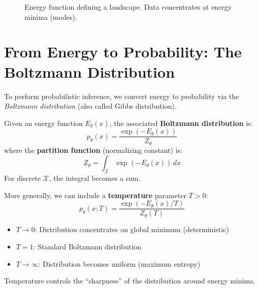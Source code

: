 \begin{figure}[h]
\centering
\caption{Energy function defining a landscape. Data concentrates at energy minima (modes).}
\end{figure}

\section{From Energy to Probability: The Boltzmann Distribution}

To perform probabilistic inference, we convert energy to probability via the \emph{Boltzmann distribution} (also called Gibbs distribution).

\begin{definition}
    Given an energy function $E_\theta(x)$, the associated \textbf{Boltzmann distribution} is:
    \[
        p_\theta(x) = \frac{\exp(-E_\theta(x))}{Z_\theta}
    \]
    where the \textbf{partition function} (normalizing constant) is:
    \[
        Z_\theta = \int_{\mathcal{X}} \exp(-E_\theta(x)) \, dx
    \]
    For discrete $\mathcal{X}$, the integral becomes a sum.
\end{definition}

\begin{remark}
    More generally, we can include a \textbf{temperature} parameter $T > 0$:
    \[
        p_\theta(x; T) = \frac{\exp(-E_\theta(x)/T)}{Z_\theta(T)}
    \]
    \begin{itemize}
        \item $T \to 0$: Distribution concentrates on global minimum (deterministic)
        \item $T = 1$: Standard Boltzmann distribution
        \item $T \to \infty$: Distribution becomes uniform (maximum entropy)
    \end{itemize}
    Temperature controls the ``sharpness'' of the distribution around energy minima.
\end{remark}


